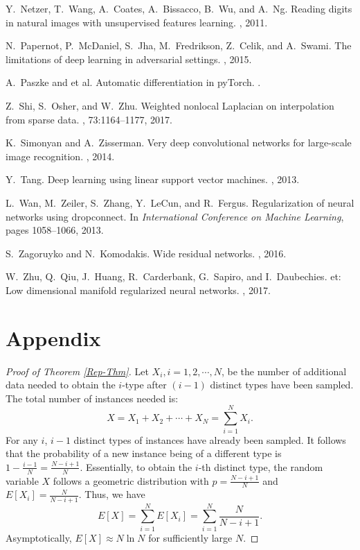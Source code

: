 \documentclass{article}
\begin{document}
\begin{thebibliography}{10}
Y.~Netzer, T.~Wang, A.~Coates, A.~Bissacco, B.~Wu, and A.~Ng.
\newblock Reading digits in natural images with unsupervised features learning.
, 2011.

N.~Papernot, P.~McDaniel, S.~Jha, M.~Fredrikson, Z.~Celik, and A.~Swami.
\newblock The limitations of deep learning in adversarial settings.
, 2015.

A.~Paszke and {et al}.
\newblock Automatic differentiation in py{T}orch.
.

Z.~Shi, S.~Osher, and W.~Zhu.
\newblock Weighted nonlocal {L}aplacian on interpolation from sparse data.
, 73:1164--1177, 2017.

K.~Simonyan and A.~Zisserman.
\newblock Very deep convolutional networks for large-scale image recognition.
, 2014.

Y.~Tang.
\newblock Deep learning using linear support vector machines.
, 2013.

L.~Wan, M.~Zeiler, S.~Zhang, Y.~LeCun, and R.~Fergus.
\newblock Regularization of neural networks using dropconnect.
\newblock In {\em International Conference on Machine Learning}, pages
  1058--1066, 2013.

S.~Zagoruyko and N.~Komodakis.
\newblock Wide residual networks.
, 2016.

W.~Zhu, Q.~Qiu, J.~Huang, R.~Carderbank, G.~Sapiro, and I.~Daubechies.
et: Low dimensional manifold regularized neural networks.
, 2017.

\end{thebibliography}


\newpage
\section*{Appendix}
\begin{proof}[Proof of Theorem \ref{Rep-Thm}]
Let $X_i, i=1, 2, \cdots, N$, be the number of additional data needed to obtain the $i$-type after $(i-1)$ distinct types have been sampled. The total number of instances needed is:
$$
X = X_1+X_2+\cdots+X_N = \sum_{i=1}^N X_i.
$$
For any $i$, $i-1$ distinct types of instances have already been sampled. It follows that  the probability of a new instance being of a different type is $1-\frac{i-1}{N}=\frac{N-i+1}{N}$. Essentially, to obtain the $i$-th distinct type, the random variable $X$ follows a geometric distribution with $p=\frac{N-i+1}{N}$ and $E[X_i]=\frac{N}{N-i+1}$. Thus, we have
$$
E[X] = \sum_{i=1}^NE[X_i]=\sum_{i=1}^N\frac{N}{N-i+1}.
$$
Asymptotically, $E[X]\approx N\ln N$ for sufficiently large $N$.
\end{proof}
\end{document}
